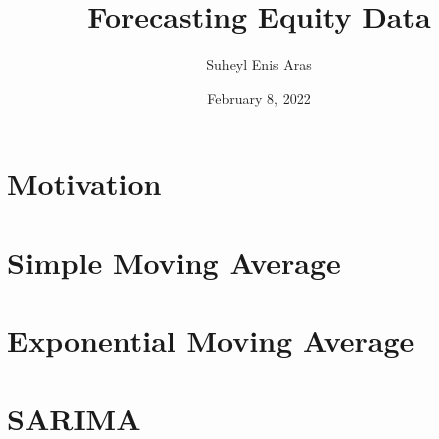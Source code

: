 \documentclass{article}
\title{Forecasting Equity Data}
\author{Suheyl Enis Aras}
\date{February 8, 2022}
\begin{document}
\maketitle

\section{Motivation}

\section*{Simple Moving Average}
\section*{Exponential Moving Average}
\section*{SARIMA}
\section*{}
\end{document}
